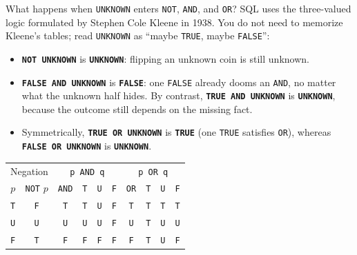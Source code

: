 What happens when \texttt{UNKNOWN} enters \texttt{NOT}, \texttt{AND}, and \texttt{OR}? SQL uses the three-valued logic formulated by Stephen Cole Kleene in 1938. You do not need to memorize Kleene's tables; read \texttt{UNKNOWN} as ``maybe \texttt{TRUE}, maybe \texttt{FALSE}'':

\begin{itemize}
  \item \textbf{\texttt{NOT UNKNOWN}} is \textbf{\texttt{UNKNOWN}}: flipping an unknown coin is still unknown.
  \item \textbf{\texttt{FALSE AND UNKNOWN}} is \textbf{\texttt{FALSE}}: one \texttt{FALSE} already dooms an \texttt{AND}, no matter what the unknown half hides. By contrast, \textbf{\texttt{TRUE AND UNKNOWN}} is \textbf{\texttt{UNKNOWN}}, because the outcome still depends on the missing fact.
  \item Symmetrically, \textbf{\texttt{TRUE OR UNKNOWN}} is \textbf{\texttt{TRUE}} (one \texttt{TRUE} satisfies \texttt{OR}), whereas \textbf{\texttt{FALSE OR UNKNOWN}} is \textbf{\texttt{UNKNOWN}}.
\end{itemize}

\begin{center}
\begin{tabular}{cc|cccc|cccc}
\toprule
\multicolumn{2}{c|}{Negation} & \multicolumn{4}{c|}{\texttt{p AND q}} & \multicolumn{4}{c}{\texttt{p OR q}} \\
$p$ & \texttt{NOT} $p$ & \texttt{AND} & \texttt{T} & \texttt{U} & \texttt{F} & \texttt{OR} & \texttt{T} & \texttt{U} & \texttt{F} \\
\midrule
\texttt{T} & \texttt{F} & \texttt{T} & \texttt{T} & \texttt{U} & \texttt{F} & \texttt{T} & \texttt{T} & \texttt{T} & \texttt{T} \\
\texttt{U} & \texttt{U} & \texttt{U} & \texttt{U} & \texttt{U} & \texttt{F} & \texttt{U} & \texttt{T} & \texttt{U} & \texttt{U} \\
\texttt{F} & \texttt{T} & \texttt{F} & \texttt{F} & \texttt{F} & \texttt{F} & \texttt{F} & \texttt{T} & \texttt{U} & \texttt{F} \\
\bottomrule
\end{tabular}
\end{center}

